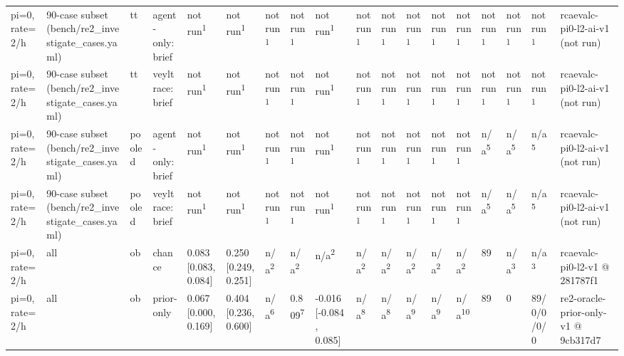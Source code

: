 \begin{table}[t]
\begin{tabular}{llllllllllllllllll}
pi=0, rate=2/h & 90-case subset (bench/re2\_investigate\_cases.yaml) & tt & agent-only:brief & not run\textsuperscript{1} & not run\textsuperscript{1} & not run\textsuperscript{1} & not run\textsuperscript{1} & not run\textsuperscript{1} & not run\textsuperscript{1} & not run\textsuperscript{1} & not run\textsuperscript{1} & not run\textsuperscript{1} & not run\textsuperscript{1} & not run\textsuperscript{1} & not run\textsuperscript{1} & not run\textsuperscript{1} & rcaevalc-pi0-l2-ai-v1 (not run) \\
pi=0, rate=2/h & 90-case subset (bench/re2\_investigate\_cases.yaml) & tt & veyltrace:brief & not run\textsuperscript{1} & not run\textsuperscript{1} & not run\textsuperscript{1} & not run\textsuperscript{1} & not run\textsuperscript{1} & not run\textsuperscript{1} & not run\textsuperscript{1} & not run\textsuperscript{1} & not run\textsuperscript{1} & not run\textsuperscript{1} & not run\textsuperscript{1} & not run\textsuperscript{1} & not run\textsuperscript{1} & rcaevalc-pi0-l2-ai-v1 (not run) \\
pi=0, rate=2/h & 90-case subset (bench/re2\_investigate\_cases.yaml) & pooled & agent-only:brief & not run\textsuperscript{1} & not run\textsuperscript{1} & not run\textsuperscript{1} & not run\textsuperscript{1} & not run\textsuperscript{1} & not run\textsuperscript{1} & not run\textsuperscript{1} & not run\textsuperscript{1} & not run\textsuperscript{1} & not run\textsuperscript{1} & n/a\textsuperscript{5} & n/a\textsuperscript{5} & n/a\textsuperscript{5} & rcaevalc-pi0-l2-ai-v1 (not run) \\
pi=0, rate=2/h & 90-case subset (bench/re2\_investigate\_cases.yaml) & pooled & veyltrace:brief & not run\textsuperscript{1} & not run\textsuperscript{1} & not run\textsuperscript{1} & not run\textsuperscript{1} & not run\textsuperscript{1} & not run\textsuperscript{1} & not run\textsuperscript{1} & not run\textsuperscript{1} & not run\textsuperscript{1} & not run\textsuperscript{1} & n/a\textsuperscript{5} & n/a\textsuperscript{5} & n/a\textsuperscript{5} & rcaevalc-pi0-l2-ai-v1 (not run) \\
pi=0, rate=2/h & all & ob & chance & 0.083 [0.083, 0.084] & 0.250 [0.249, 0.251] & n/a\textsuperscript{2} & n/a\textsuperscript{2} & n/a\textsuperscript{2} & n/a\textsuperscript{2} & n/a\textsuperscript{2} & n/a\textsuperscript{2} & n/a\textsuperscript{2} & n/a\textsuperscript{2} & 89 & n/a\textsuperscript{3} & n/a\textsuperscript{3} & rcaevalc-pi0-l2-v1 @ 281787f1 \\
pi=0, rate=2/h & all & ob & prior-only & 0.067 [0.000, 0.169] & 0.404 [0.236, 0.600] & n/a\textsuperscript{6} & 0.809\textsuperscript{7} & -0.016 [-0.084, 0.085] & n/a\textsuperscript{8} & n/a\textsuperscript{8} & n/a\textsuperscript{9} & n/a\textsuperscript{9} & n/a\textsuperscript{10} & 89 & 0 & 89/0/0/0/0 & re2-oracle-prior-only-v1 @ 9cb317d7 \\

\end{tabular}
\end{table}
